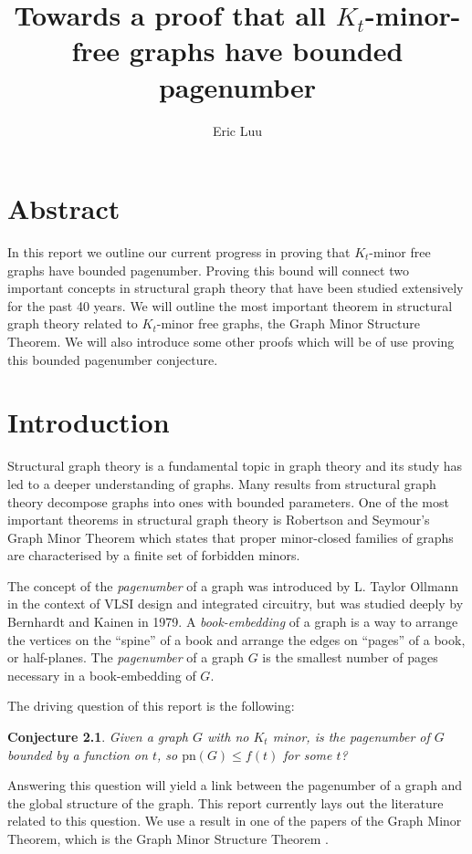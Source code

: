\documentclass[]{report}
\title{Towards a proof that all $K_t$-minor-free graphs have bounded pagenumber}
\author{Eric Luu}
\newcommand{\pn}{\text{pn}}
\newtheorem{conjecture}[theorem]{Conjecture}
\theoremstyle{definition}
\numberwithin{theorem}{section}
\numberwithin{equation}{section}
\begin{document}
\maketitle
\chapter{Abstract}\label{abstract}
In this report we outline our current progress in proving that $K_t$-minor free graphs have bounded pagenumber. Proving this bound will connect two important concepts in structural graph theory that have been studied extensively for the past 40 years. We will outline the most important theorem in structural graph theory related to $K_t$-minor free graphs, the Graph Minor Structure Theorem. We will also introduce some other proofs which will be of use proving this bounded pagenumber conjecture. 
\chapter{Introduction}\label{sec:introduction}
Structural graph theory is a fundamental topic in graph theory and its study has led to a deeper understanding of graphs. Many results from structural graph theory decompose graphs into ones with bounded parameters. One of the most important theorems in structural graph theory is Robertson and Seymour's Graph Minor Theorem \cite{robertsonGraphMinorsXX2004} which states that proper minor-closed families of graphs are characterised by a finite set of forbidden minors. 
\par
The concept of the \textit{pagenumber} of a graph was introduced by L. Taylor Ollmann \cite{ollmannBookThicknessVarious1973} in the context of VLSI design and integrated circuitry, but was studied deeply by Bernhardt and Kainen\cite{bernhartBookThicknessGraph1979} in 1979. A \textit{book-embedding} of a graph is a way to arrange the vertices on the ``spine'' of a book and arrange the edges on ``pages'' of a book, or half-planes. The \textit{pagenumber} of a graph $G$ is the smallest number of pages necessary in a book-embedding of $G$. 

The driving question of this report is the following: 
\begin{conjecture}\label{conj:bded_had_pn}
	Given a graph $G$ with no $K_t$ minor, is the pagenumber of $G$ bounded by a function on $t$, so $\pn(G) \leq f(t)$ for some $t$?
\end{conjecture}
Answering this question will yield a link between the pagenumber of a graph and the global structure of the graph. This report currently lays out the literature related to this question. We use a result in one of the papers of the Graph Minor Theorem, which is the Graph Minor Structure Theorem \cite{robertsonGraphMinorsXVI2003}.
\end{document}
